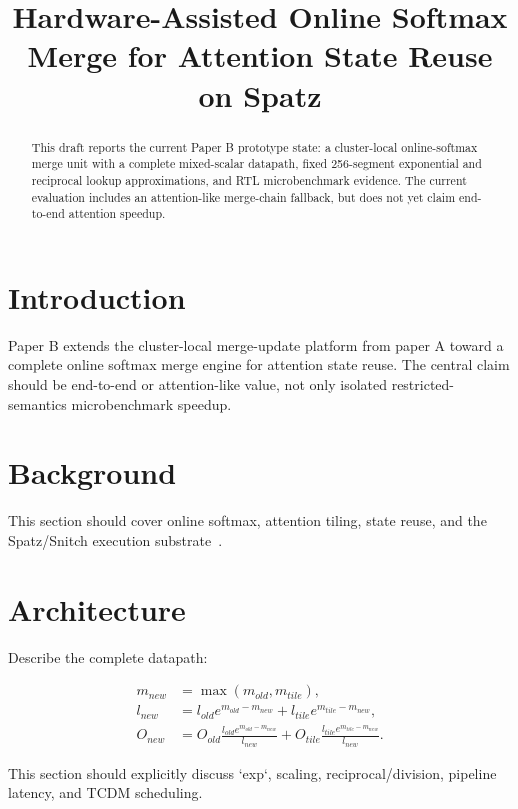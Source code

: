 \documentclass[conference]{IEEEtran}
\title{Hardware-Assisted Online Softmax Merge for Attention State Reuse on Spatz}
\author{
  \IEEEauthorblockN{Wenxuan Tang}
  \IEEEauthorblockA{Local Spatz Prototype Study}
}
\begin{document}
\maketitle

\begin{abstract}
This draft reports the current Paper B prototype state: a cluster-local
online-softmax merge unit with a complete mixed-scalar datapath, fixed
256-segment exponential and reciprocal lookup approximations, and RTL
microbenchmark evidence. The current evaluation includes an attention-like
merge-chain fallback, but does not yet claim end-to-end attention speedup.
\end{abstract}

\section{Introduction}

Paper B extends the cluster-local merge-update platform from paper A toward a
complete online softmax merge engine for attention state reuse. The central
claim should be end-to-end or attention-like value, not only isolated
restricted-semantics microbenchmark speedup.

\section{Background}

This section should cover online softmax, attention tiling, state reuse, and
the Spatz/Snitch execution substrate~\cite{online-softmax2018,flashattention2022,spatz2023,snitch2020}.

\section{Architecture}

Describe the complete datapath:

\begin{align}
m_{new} &= \max(m_{old}, m_{tile}), \\
l_{new} &= l_{old}e^{m_{old}-m_{new}} +
           l_{tile}e^{m_{tile}-m_{new}}, \\
O_{new} &= O_{old}
          \frac{l_{old}e^{m_{old}-m_{new}}}{l_{new}} +
          O_{tile}
          \frac{l_{tile}e^{m_{tile}-m_{new}}}{l_{new}}.
\end{align}

This section should explicitly discuss `exp`, scaling, reciprocal/division,
pipeline latency, and TCDM scheduling.
\end{document}
